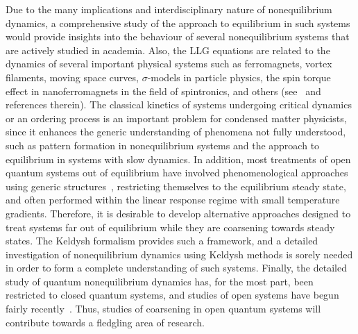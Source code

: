 \documentclass[a4paper,11pt,color]{article}
\begin{document}
\begin{enumerate}[label=(\alph*)]
Due to the many implications and interdisciplinary nature of nonequilibrium dynamics, a comprehensive study of the approach to equilibrium in such systems would provide insights into the behaviour of several nonequilibrium systems that are actively studied in academia. Also, the LLG equations are related to the dynamics of several important physical systems such as ferromagnets, vortex filaments, moving space curves, $\sigma$-models in particle physics, the spin torque effect in 
nanoferromagnets in the field of spintronics, and others (see~\cite{gll:review} and references therein). The classical kinetics of systems undergoing critical dynamics or an ordering process is an important problem for condensed matter physicists, since it enhances the generic understanding of phenomena not fully understood, such as pattern formation in nonequilibrium systems and the approach to equilibrium in systems with slow dynamics. In addition, most treatments of open quantum systems out of equilibrium have involved phenomenological approaches using generic structures~\cite{openspin}, restricting  themselves to the equilibrium steady state, and often performed within the linear response regime with small temperature gradients. Therefore, it is desirable to develop alternative approaches designed to treat systems far out of equilibrium while they are coarsening towards steady states. The Keldysh formalism provides such a framework, and a detailed investigation of nonequilibrium dynamics using Keldysh 
methods is sorely needed in order to form a complete understanding of such systems. Finally, the detailed study of quantum nonequilibrium dynamics has, for the most part, been restricted to closed quantum systems, and studies of open systems have begun fairly recently~\cite{daley}. Thus, studies of coarsening in open quantum systems will contribute towards a fledgling area of research. 


\end{enumerate}
\end{document}
